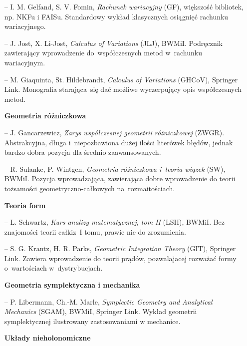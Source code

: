 \documentclass[a4paper,11pt]{article}
\begin{document}
\begin{itemize}
\item[--] I. M. Gelfand, S. V. Fomin, \textit{Rachunek wariacyjny} (GF),
  większość bibliotek, np. NKFu i FAISu. Standardowy wykład
  klasycznych osiągnięć rachunku wariacyjnego.

\item[--] J. Jost, X. Li-Jost, \textit{Calculus of Variations} (JLJ),
  BWMiI. Podręcznik zawierający wprowadzenie do~współczesnych metod
  w~rachunku wariacyjnym.

\item[--] M. Giaquinta, St. Hildebrandt, \textit{Calculus of Variations}
  (GHCoV), Springer Link. Monografia starająca~się dać możliwe
  wyczerpujący opis współczesnych metod.


\item[] \textbf{Geometria różniczkowa}

\item[--] J. Gancarzewicz, \textit{Zarys współczesnej geometrii
    różniczkowej} (ZWGR). Abstrakcyjna, długa i~niepozbawiona dużej ilości
  literówek błędów, jednak bardzo dobra pozycja dla średnio zaawansowanych.

\item[--] R. Sulanke, P. Wintgen, \textit{Geometria różniczkowa i~teoria
    wiązek} (SW), BWMiI. Pozycja wprowadzająca, zawierająca dobre
  wprowadzenie do teorii tożsamości geometryczno-całkowych
  na~rozmaitościach.


\item[] \textbf{Teoria form}

\item[--] L. Schwartz, \textit{Kurs analizy matematycznej, tom II}
  (LSII), BWMiI. Bez znajomości teorii całki\linebreak z~I tomu,
  prawie nie do zrozumienia.

\item[--] S. G. Krantz, H. R. Parks, \textit{Geometric Integration
    Theory} (GIT), Springer Link. Zawiera wprowadzenie do teorii
  prądów, pozwalajacej rozważać formy o~wartościach w~dystrybucjach.

\item[] \textbf{Geometria symplektyczna i mechanika}

\item[--] P. Libermann, Ch.-M. Marle, \textit{Symplectic Geometry
    and Analytical Mechanics} (SGAM), BWMiI, Springer Link. Wykład
  geometrii symplektycznej ilustrowany zastosowaniami w mechanice.

\item[] \textbf{Układy nieholonomiczne}


\end{itemize}
\end{document}
